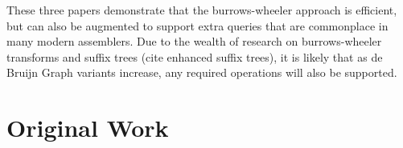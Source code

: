 These three papers demonstrate that the burrows-wheeler approach is efficient, but can also be augmented to support extra queries that are commonplace in many modern assemblers. Due to the wealth of research on burrows-wheeler transforms and suffix trees (cite enhanced suffix trees), it is likely that as de Bruijn Graph variants increase, any required operations will also be supported.

\section*{Original Work}
%
